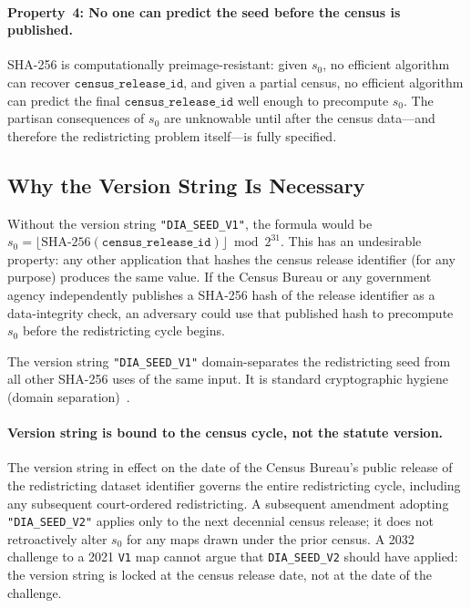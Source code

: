 \paragraph{Property~4: No one can predict the seed before the census is published.}
SHA-256 is computationally preimage-resistant: given $s_0$, no efficient
algorithm can recover $\mathtt{census\_release\_id}$, and given a partial
census, no efficient algorithm can predict the final
$\mathtt{census\_release\_id}$ well enough to precompute $s_0$.
The partisan consequences of $s_0$ are unknowable until after the census
data---and therefore the redistricting problem itself---is fully specified.

\subsection{Why the Version String Is Necessary}

Without the version string \texttt{"DIA\_SEED\_V1"}, the formula would be
$s_0 = \lfloor \mathrm{SHA\text{-}256}(\mathtt{census\_release\_id}) \rfloor
\bmod 2^{31}$.
This has an undesirable property: any other application that hashes the census
release identifier (for any purpose) produces the same value.
If the Census Bureau or any government agency independently publishes a SHA-256
hash of the release identifier as a data-integrity check, an adversary could
use that published hash to precompute $s_0$ before the redistricting cycle
begins.

The version string \texttt{"DIA\_SEED\_V1"} domain-separates the
redistricting seed from all other SHA-256 uses of the same input.
It is standard cryptographic hygiene (domain separation)~\citep{bernstein2019}.

\paragraph{Version string is bound to the census cycle, not the statute version.}
The version string in effect on the date of the Census Bureau's public release
of the redistricting dataset identifier governs the entire redistricting cycle,
including any subsequent court-ordered redistricting.
A subsequent \dia{} amendment adopting \texttt{"DIA\_SEED\_V2"} applies only
to the next decennial census release; it does not retroactively alter $s_0$
for any maps drawn under the prior census.
A 2032 challenge to a 2021 \texttt{V1} map cannot argue that
\texttt{DIA\_SEED\_V2} should have applied: the version string is locked at
the census release date, not at the date of the challenge.


